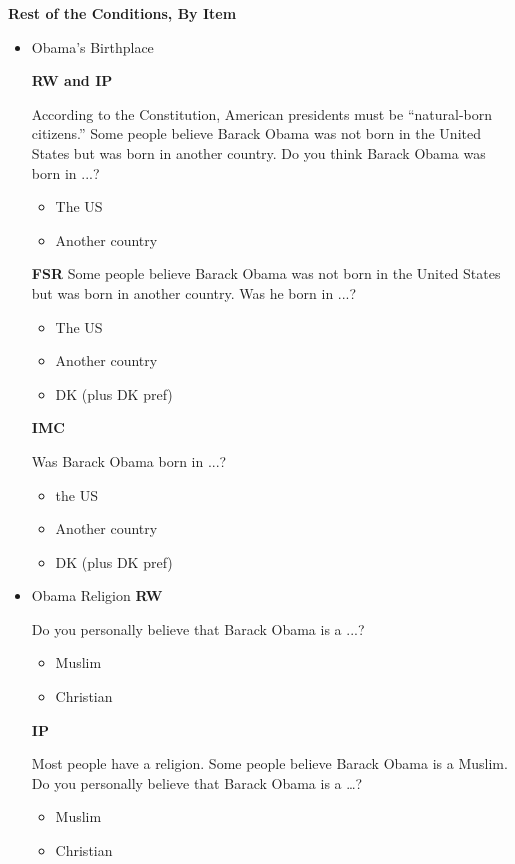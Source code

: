 \textbf{Rest of the Conditions, By Item}

\begin{itemize}
\item Obama's Birthplace

\textbf{RW and IP}\newline

According to the Constitution, American presidents must be ``natural-born citizens.''
Some people believe Barack Obama was not born in the United States but was born
in another country. Do you think Barack Obama was born in ...?
\begin{itemize}
	\item The US
	\item Another country
\end{itemize}

\textbf{FSR}\newline
Some people believe Barack Obama was not born in the United States but was born
in another country. Was he born in ...?
\begin{itemize}
	\item The US
	\item Another country
	\item DK (plus DK pref)
\end{itemize}

\textbf{IMC}\newline

Was Barack Obama born in ...?
\begin{itemize}
	\item the US
	\item Another country
	\item DK (plus DK pref)
\end{itemize}

\item Obama Religion\newline
\textbf{RW}\newline

Do you personally believe that Barack Obama is a ...?
\begin{itemize}
	\item Muslim
	\item Christian
\end{itemize}

\textbf{IP}\newline

Most people have a religion. Some people believe Barack Obama is a Muslim. Do you personally believe that Barack Obama is a \ldots?
\begin{itemize}
	\item Muslim
	\item Christian
\end{itemize}


\end{itemize}
